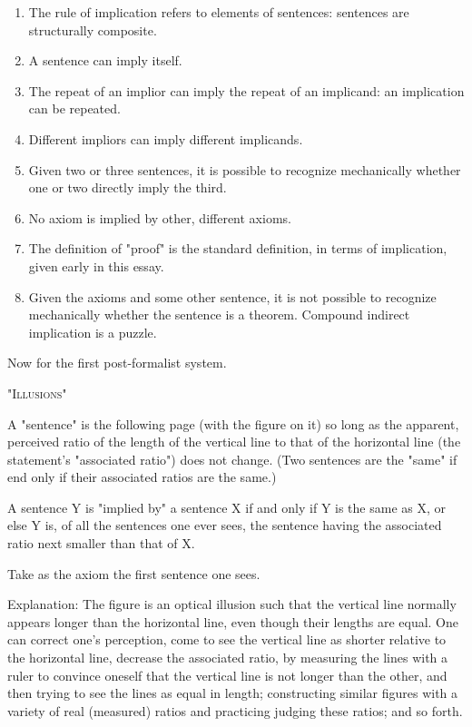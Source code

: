 \documentclass[10pt,twoside]{memoir}
\begin{document}
\begin{enumerate}
{\begin{enumerate}
\begin{enumerate}
\item The rule of implication refers to elements of sentences: sentences 
are structurally composite. 

\item A sentence can imply itself. 

\item The repeat of an implior can imply the repeat of an implicand: an 
implication can be repeated. 

\item Different impliors can imply different implicands. 

\item Given two or three sentences, it is possible to recognize 
mechanically whether one or two directly imply the third. 

\item No axiom is implied by other, different axioms. 

\item The definition of "proof" is the standard definition, in terms of 
implication, given early in this essay. 

\item Given the axioms and some other sentence, it is not possible to 
recognize mechanically whether the sentence is a theorem.
Compound indirect implication is a puzzle. 
\end{enumerate}

Now for the first post-formalist system. 

{ \centering \large "\textsc{Illusions}" \par}

\begin{sysrules}
A "sentence" is the following page (with the figure on it) so long as the 
apparent, perceived ratio of the length of the vertical line to that 
of the horizontal line (the statement's "associated ratio") does not 
change. (Two sentences are the "same" if end only if their 
associated ratios are the same.) 

A sentence Y is "implied by" a sentence X if and only if Y is the same as X, 
or else Y is, of all the sentences one ever sees, the sentence having 
the associated ratio next smaller than that of X. 

Take as the axiom the first sentence one sees. 

Explanation: The figure is an optical illusion such that the vertical line 
normally appears longer than the horizontal line, even though their 
lengths are equal. One can correct one's perception, come to see 
the vertical line as shorter relative to the horizontal line, decrease 
the associated ratio, by measuring the lines with a ruler to convince 
oneself that the vertical line is not longer than the other, and then 
trying to see the lines as equal in length; constructing similar 
figures with a variety of real (measured) ratios and practicing 
judging these ratios; and so forth. 
\begin{sysrules}


\end{sysrules}
\end{sysrules}
\end{enumerate}}
\end{enumerate}
\end{document}
